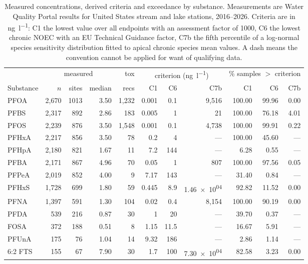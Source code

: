 \begin{table}[p]
\centering
\caption{Measured concentrations, derived criteria and exceedance by substance.
Measurements are Water Quality Portal results for United States stream and lake
stations, 2016--2026. Criteria are in \si{\nano\gram\per\litre}: C1 the lowest
value over all endpoints with an assessment factor of 1000, C6 the lowest
chronic \textsf{NOEC} with an EU Technical Guidance factor, C7b the fifth
percentile of a log-normal species sensitivity distribution fitted to apical
chronic species mean values. A dash means the convention cannot be applied for
want of qualifying data.}
\label{tab:persub}
\scriptsize
\setlength{\tabcolsep}{3.2pt}
\begin{tabular}{@{}l r r r r r r r r r r@{}}
\toprule
 & \multicolumn{3}{c}{measured} & tox & \multicolumn{3}{c}{criterion (\si{\nano\gram\per\litre})}
 & \multicolumn{3}{c}{\% samples $>$ criterion} \\
\cmidrule(lr){2-4}\cmidrule(lr){6-8}\cmidrule(lr){9-11}
Substance & $n$ & sites & median & recs & C1 & C6 & C7b & C1 & C6 & C7b \\
\midrule
PFOA & 2,670 & 1013 & 3.50 & 1,232 & 0.001 & 0.1 & 9,516 & 100.00 & 99.96 & 0.00 \\
PFBS & 2,317 & 892 & 2.86 & 183 & 0.005 & 1 & 21 & 100.00 & 76.18 & 4.01 \\
PFOS & 2,239 & 876 & 3.50 & 1,548 & 0.001 & 0.1 & 4,738 & 100.00 & 99.91 & 0.22 \\
PFHxA & 2,217 & 856 & 3.50 & 78 & 0.2 & 4 & --- & 100.00 & 45.60 & --- \\
PFHpA & 2,180 & 821 & 1.67 & 11 & 7.2 & 144 & --- & 6.28 & 0.55 & --- \\
PFBA & 2,171 & 867 & 4.96 & 70 & 0.05 & 1 & 807 & 100.00 & 97.56 & 0.05 \\
PFPeA & 2,019 & 852 & 4.00 & 9 & 7.17 & 143 & --- & 31.40 & 0.84 & --- \\
PFHxS & 1,728 & 699 & 1.80 & 59 & 0.445 & 8.9 & \num{1.46e+04} & 92.82 & 11.52 & 0.00 \\
PFNA & 1,397 & 591 & 1.30 & 104 & 0.02 & 0.4 & 8,154 & 100.00 & 90.19 & 0.00 \\
PFDA & 539 & 216 & 0.87 & 30 & 1 & 20 & --- & 39.70 & 0.37 & --- \\
FOSA & 372 & 188 & 0.51 & 8 & 1.15 & 11.5 & --- & 16.67 & 5.91 & --- \\
PFUnA & 175 & 76 & 1.04 & 14 & 9.32 & 186 & --- & 2.86 & 1.14 & --- \\
6:2 FTS & 155 & 67 & 7.90 & 30 & 1.7 & 100 & \num{7.30e+04} & 82.58 & 3.23 & 0.00 \\

\end{tabular}
\end{table}
